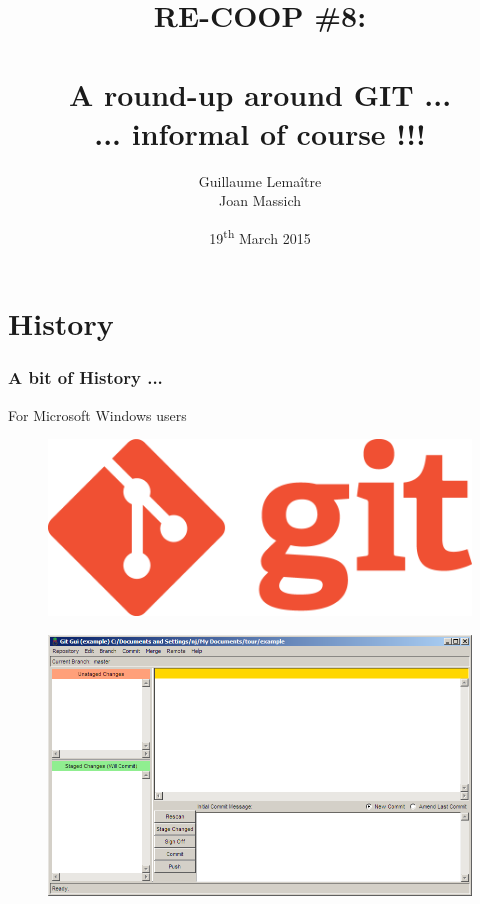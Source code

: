 \documentclass{beamer}
\title{RE-COOP \#8: \\ \  \\ {\Large A round-up around GIT ... \\ ... informal of course !!!}}
\author{Guillaume Lema\^itre \\ Joan Massich}
\date{19\textsuperscript{th} March 2015}
\institute{Universitat de Girona, Universit\'e de Bourgogne}
\begin{document}
\begin{frame}
  \titlepage
\end{frame}

\begin{frame}[shrink=40]
  \vspace{40px}
  \tableofcontents[sectionstyle=show,subsectionstyle=show,subsubsectionstyle=hide]
\end{frame}

\section{History}


\begin{frame}
  \frametitle{A bit of History ...}
  \begin{block}{For Microsoft Windows users}
    \begin{figure}
      \centering
      \includegraphics[width=.2\textwidth]{./images/git-logo.png}
    \end{figure}
    \begin{figure}
      \centering
      \includegraphics[width=.6\textwidth]{./images/git-windows.png}
    \end{figure}
  \end{block}
\end{frame}
\end{document}
